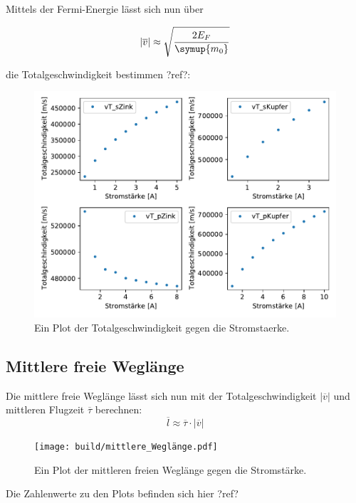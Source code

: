     Mittels der Fermi-Energie lässt sich nun über 

    \begin{equation}
        |\overline{v}| \approx \sqrt{\frac{2E_F}{\symup{m_0}}} \nonumber
    \end{equation}

    die Totalgeschwindigkeit bestimmen ?ref?: 

    \begin{figure}[H]
        \centering
        \includegraphics[width=1.1\textwidth]{build/Totalgeschwindigkeit.pdf}
        \caption{Ein Plot der Totalgeschwindigkeit gegen die Stromstaerke.}
        \label{img:vT}
    \end{figure}


    \subsection{Mittlere freie Weglänge}


    Die mittlere freie Weglänge lässt sich nun mit der Totalgeschwindigkeit $|\overline{v}|$ und mittleren Flugzeit $\overline{\tau}$ berechnen:
    \begin{equation}
        \overline{l} \approx \overline{\tau} \cdot |\overline{v}| \nonumber
    \end{equation}

    
    \begin{figure}[H]
        \centering
        \texttt{[image: build/mittlere\_Weglänge.pdf]}
        \caption{Ein Plot der mittleren freien Weglänge gegen die Stromstärke.}
        \label{img:mfl}
    \end{figure}
    \noindent
    Die Zahlenwerte zu den Plots befinden sich hier ?ref?

